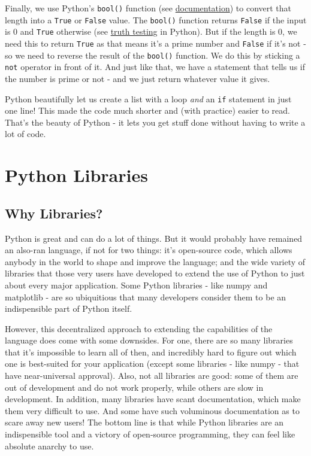 \documentclass[12pt]{article}
\newcommand{\code}{\texttt}
\begin{document}
Finally, we use Python's \code{bool()} function (see \href{https://docs.python.org/3/library/functions.html#bool}{documentation}) to convert that length into a \code{True} or \code{False} value. The \code{bool()} function returns \code{False} if the input is 0 and \code{True} otherwise (see \href{https://docs.python.org/3/library/stdtypes.html#truth}{truth testing} in Python). But if the length is 0, we need this to return \code{True} as that means it's a prime number and \code{False} if it's not - so we need to reverse the result of the \code{bool()} function. We do this by sticking a \code{not} operator in front of it. And just like that, we have a statement that tells us if the number is prime or not - and we just return whatever value it gives. 

Python beautifully let us create a list with a loop \textit{and} an \code{if} statement in just one line! This made the code much shorter and (with practice) easier to read. That's the beauty of Python - it lets you get stuff done without having to write a lot of code.

\newpage
\section{Python Libraries}
\subsection{Why Libraries?}
Python is great and can do a lot of things. But it would probably have remained an also-ran language, if not for two things: it's open-source code, which allows anybody in the world to shape and improve the language; and the wide variety of libraries that those very users have developed to extend the use of Python to just about every major application. Some Python libraries - like numpy and matplotlib - are so ubiquitious that many developers consider them to be an indispensible part of Python itself.

However, this decentralized approach to extending the capabilities of the language does come with some downsides. For one, there are so many libraries that it's impossible to learn all of then, and incredibly hard to figure out which one is best-suited for your application (except some libraries - like numpy - that have near-universal approval). Also, not all libraries are good: some of them are out of development and do not work properly, while others are slow in development. In addition, many libraries have scant documentation, which make them very difficult to use. And some have such voluminous documentation as to scare away new users! The bottom line is that while Python libraries are an indispensible tool and a victory of open-source programming, they can feel like absolute anarchy to use. 
\end{document}
